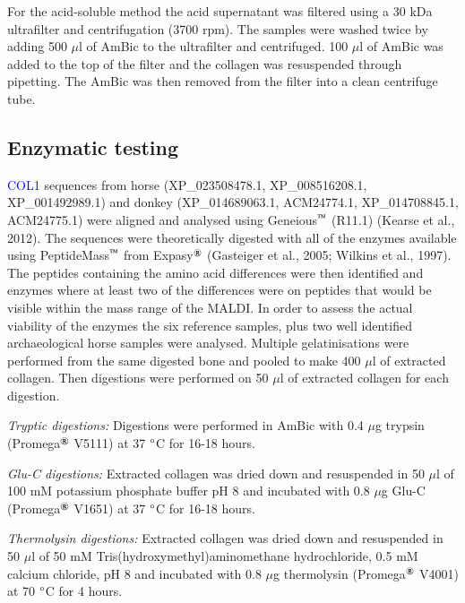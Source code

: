 \documentclass[preprint, 3p, authoryear]{elsarticle} %
\begin{document}
For the acid-soluble method the acid supernatant was filtered using a 30 kDa ultrafilter and centrifugation (3700 rpm). The samples were washed twice by adding 500 \(\mu\)l of AmBic to the ultrafilter and centrifuged. 100 \(\mu\)l of AmBic was added to the top of the filter and the collagen was resuspended through pipetting. The AmBic was then removed from the filter into a clean centrifuge tube.

\hypertarget{enzymatic-testing}{%
\subsection{Enzymatic testing}\label{enzymatic-testing}}

\textcolor{blue}{COL1} sequences from horse (XP\_023508478.1, XP\_008516208.1, XP\_001492989.1) and donkey (XP\_014689063.1, ACM24774.1, XP\_014708845.1, ACM24775.1) were aligned and analysed using Geneious\(^\text{\texttrademark}\) (R11.1) (Kearse et al., 2012). The sequences were theoretically digested with all of the enzymes available using PeptideMass\(^\text{\texttrademark}\) from Expasy\(^\text{\textregistered}\) (Gasteiger et al., 2005; Wilkins et al., 1997). The peptides containing the amino acid differences were then identified and enzymes where at least two of the differences were on peptides that would be visible within the mass range of the MALDI. In order to assess the actual viability of the enzymes the six reference samples, plus two well identified archaeological horse samples were analysed. Multiple gelatinisations were performed from the same digested bone and pooled to make 400 \(\mu\)l of extracted collagen. Then digestions were performed on 50 \(\mu\)l of extracted collagen for each digestion.

\emph{Tryptic digestions:} Digestions were performed in AmBic with 0.4 \(\mu\)g trypsin (Promega\(^\text{\textregistered}\) V5111) at 37 \(\text{\textdegree}\)C for 16-18 hours.

\emph{Glu-C digestions:} Extracted collagen was dried down and resuspended in 50 \(\mu\)l of 100 mM potassium phosphate buffer pH 8 and incubated with 0.8 \(\mu\)g Glu-C (Promega\(^\text{\textregistered}\) V1651) at 37 \(\text{\textdegree}\)C for 16-18 hours.

\emph{Thermolysin digestions:} Extracted collagen was dried down and resuspended in 50 \(\mu\)l of 50 mM Tris(hydroxymethyl)aminomethane hydrochloride, 0.5 mM calcium chloride, pH 8 and incubated with 0.8 \(\mu\)g thermolysin (Promega\(^\text{\textregistered}\) V4001) at 70 \(\text{\textdegree}\)C for 4 hours.
\end{document}
